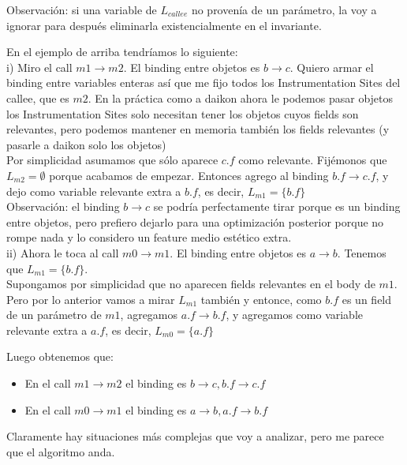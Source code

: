 \documentclass[10pt,a4paper,final]{report}
\begin{document}
Observación: si una variable de $L_{callee}$ no provenía de un parámetro, la voy a ignorar para después eliminarla existencialmente en el invariante.


En el ejemplo de arriba tendríamos lo siguiente: \\



i) Miro el call $m1 \rightarrow m2$. El binding entre objetos es $b \rightarrow c$. Quiero armar el binding entre variables enteras así que me fijo todos los Instrumentation Sites del callee, que es $m2$. En la práctica como a daikon ahora le podemos pasar objetos los Instrumentation Sites solo necesitan tener los objetos cuyos fields son relevantes, pero podemos mantener en memoria también los fields relevantes (y pasarle a daikon solo los objetos) \\

Por simplicidad asumamos que sólo aparece $c.f$ como relevante. Fijémonos que $L_{m2} = \emptyset$ porque acabamos de empezar. Entonces agrego al binding $b.f \rightarrow c.f$, y dejo como variable relevante extra a $b.f$, es decir, $L_{m1} = \{ b.f \}$\\

Observación: el binding $b \rightarrow c$ se podría perfectamente tirar porque es un binding entre objetos, pero prefiero dejarlo para una optimización posterior porque no rompe nada y lo considero un feature medio estético extra.\\

ii) Ahora le toca al call $m0 \rightarrow m1$. El binding entre objetos es $a \rightarrow b$. Tenemos que $L_{m1} = \{ b.f \}$.\\

Supongamos por simplicidad que no aparecen fields relevantes en el body de $m1$. Pero por lo anterior vamos a mirar $L_{m1}$ también y entonce, como $b.f$ es un field de un parámetro de $m1$, agregamos $a.f \rightarrow b.f$, y agregamos como variable relevante extra a $a.f$, es decir, $L_{m0} = \{ a.f \}$

Luego obtenemos que:

\begin{itemize}
	\item En el call $m1 \rightarrow m2$ el binding es $b\rightarrow c, b.f \rightarrow c.f$
	\item En el call $m0 \rightarrow m1$ el binding es $a\rightarrow b, a.f \rightarrow b.f$
\end{itemize}

Claramente hay situaciones más complejas que voy a analizar, pero me parece que el algoritmo anda.
\end{document}
